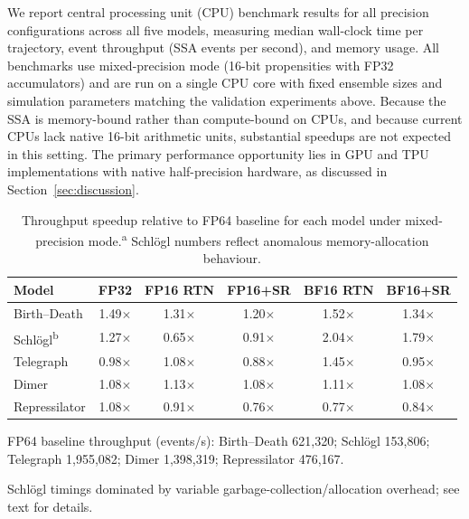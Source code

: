 \documentclass{article}
\begin{document}
We report central processing unit (CPU) benchmark results for all precision configurations across all five models, measuring median wall-clock time per trajectory, event throughput (SSA events per second), and memory usage. All benchmarks use mixed-precision mode (16-bit propensities with FP32 accumulators) and are run on a single CPU core with fixed ensemble sizes and simulation parameters matching the validation experiments above. Because the SSA is memory-bound rather than compute-bound on CPUs, and because current CPUs lack native 16-bit arithmetic units, substantial speedups are not expected in this setting. The primary performance opportunity lies in GPU and TPU implementations with native half-precision hardware, as discussed in Section~\ref{sec:discussion}.

\begin{table}[ht]
    \centering
    \small
    \begin{threeparttable}
    \begin{tabular}{@{}lccccc@{}}
        \toprule
        Model & FP32 & FP16 RTN & FP16+SR & BF16 RTN & BF16+SR \\
        \midrule
        Birth--Death   & 1.49$\times$ & 1.31$\times$ & 1.20$\times$ & 1.52$\times$ & 1.34$\times$ \\
        Schl\"{o}gl\textsuperscript{b} & 1.27$\times$ & 0.65$\times$ & 0.91$\times$ & 2.04$\times$ & 1.79$\times$ \\
        Telegraph      & 0.98$\times$ & 1.08$\times$ & 0.88$\times$ & 1.45$\times$ & 0.95$\times$ \\
        Dimer          & 1.08$\times$ & 1.13$\times$ & 1.08$\times$ & 1.11$\times$ & 1.08$\times$ \\
        Repressilator  & 1.08$\times$ & 0.91$\times$ & 0.76$\times$ & 0.77$\times$ & 0.84$\times$ \\
        \bottomrule
    \end{tabular}
    \begin{tablenotes}
        \footnotesize
        \item[a] FP64 baseline throughput (events/s): Birth--Death 621,320; Schl\"{o}gl 153,806; Telegraph 1,955,082; Dimer 1,398,319; Repressilator 476,167.
        \item[b] Schl\"{o}gl timings dominated by variable garbage-collection/allocation overhead; see text for details.
    \end{tablenotes}
    \end{threeparttable}
    \caption{Throughput speedup relative to FP64 baseline for each model under mixed-precision mode.\textsuperscript{a} Schl\"{o}gl numbers reflect anomalous memory-allocation behaviour.}
    \label{tab:benchmarks}
\end{table}
\end{document}
